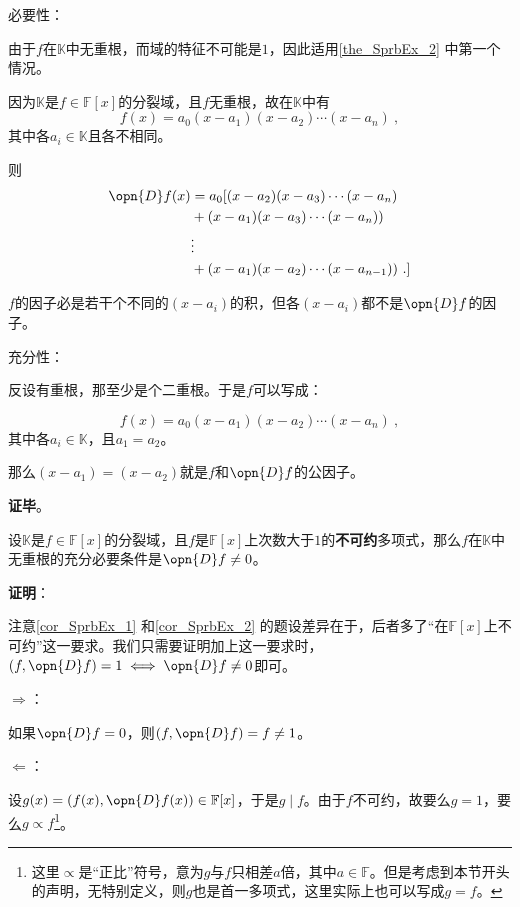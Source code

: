 必要性：

由于$f$在$\mathbb{K}$中无重根，而域的特征不可能是$1$，因此适用\autoref{the_SprbEx_2} 中第一个情况。

因为$\mathbb{K}$是$f\in\mathbb{F}[x]$的分裂域，且$f$无重根，故在$\mathbb{K}$中有
\begin{equation}
f(x) = a_0(x-a_1)(x-a_2)\cdots(x-a_n)~,
\end{equation}
其中各$a_i\in\mathbb{K}$且各不相同。

则
\begin{equation}
\begin{aligned}
\opn{D}f(x) &= a_0[(x-a_2)(x-a_3)\cdots(x-a_n)\\
&+(x-a_1)(x-a_3)\cdots(x-a_n))\\
&\vdots\\
&+(x-a_1)(x-a_2)\cdots(x-a_{n-1}))~.
]
\end{aligned}
\end{equation}

$f$的因子必是若干个不同的$(x-a_i)$的积，但各$(x-a_i)$都不是$\opn{D}f$的因子。

充分性：

反设有重根，那至少是个二重根。于是$f$可以写成：

\begin{equation}
f(x) = a_0(x-a_1)(x-a_2)\cdots(x-a_n)~,
\end{equation}
其中各$a_i\in\mathbb{K}$，且$a_1=a_2$。

那么$(x-a_1)=(x-a_2)$就是$f$和$\opn{D}f$的公因子。

\textbf{证毕}。



\begin{corollary}{}\label{cor_SprbEx_2}
设$\mathbb{K}$是$f\in\mathbb{F}[x]$的分裂域，且$f$是$\mathbb{F}[x]$上次数大于$1$的\textbf{不可约}多项式，那么$f$在$\mathbb{K}$中无重根的充分必要条件是$\opn{D}f \neq 0$。
\end{corollary}

\textbf{证明}：

注意\autoref{cor_SprbEx_1} 和\autoref{cor_SprbEx_2} 的题设差异在于，后者多了“在$\mathbb{F}[x]$上不可约”这一要求。我们只需要证明加上这一要求时，$(f, \opn{D}f)=1 \iff \opn{D}f\neq 0$即可。

$\Rightarrow$：

如果$\opn{D}f=0$，则$(f, \opn{D}f)=f\neq 1$。

$\Leftarrow$：

设$g(x)=(f(x), \opn{D}f(x))\in\mathbb{F}[x]$，于是$g\mid f$。由于$f$不可约，故要么$g=1$，要么$g\propto f$\footnote{这里$\propto$是“正比”符号，意为$g$与$f$只相差$a$倍，其中$a\in\mathbb{F}$。但是考虑到本节开头的声明，无特别定义，则$g$也是首一多项式，这里实际上也可以写成$g=f$。}。

